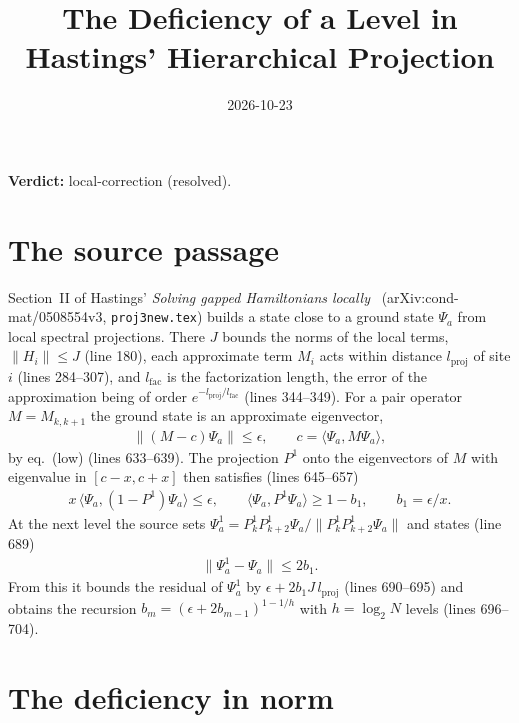 \documentclass{article}
\title{The Deficiency of a Level in Hastings' Hierarchical Projection}
\author{}
\date{2026-10-23}
\providecommand{\gapnote}[2]{\par\noindent\textbf{Verdict:} #1 (#2).\par}
\begin{document}
\maketitle
\gapnote{local-correction}{resolved}

\section{The source passage}

Section~II of Hastings' \emph{Solving gapped Hamiltonians
    locally}~\cite{Hastings2006Solving} (arXiv:cond-mat/0508554v3,
\texttt{proj3new.tex}) builds a state close to a ground state $\Psi_a$ from
local spectral projections. There $J$ bounds the norms of the local terms,
$\lVert H_i\rVert\le J$ (line 180), each approximate term $M_i$ acts within
distance $l_{\mathrm{proj}}$ of site $i$ (lines 284--307), and
$l_{\mathrm{fac}}$ is the factorization length, the error of the
approximation being of order $e^{-l_{\mathrm{proj}}/l_{\mathrm{fac}}}$
(lines 344--349). For a pair operator $M=M_{k,k+1}$ the ground state
is an approximate eigenvector,
\begin{align}\label{eq:hastings05_hierarchical_projection_ground_state_residual}
    \bigl\lVert(M-c)\Psi_a\bigr\rVert\le\epsilon,
    \qquad c=\langle\Psi_a,M\Psi_a\rangle,
\end{align}
by eq.~(low) (lines 633--639). The projection $P^1$ onto the eigenvectors of
$M$ with eigenvalue in $[c-x,c+x]$ then satisfies (lines 645--657)
\begin{align}\label{eq:hastings05_hierarchical_projection_projection_expectation}
    x\,\langle\Psi_a,(1-P^1)\Psi_a\rangle\le\epsilon,
    \qquad\langle\Psi_a,P^1\Psi_a\rangle\ge1-b_1,
    \qquad b_1=\epsilon/x .
\end{align}
At the next level the source sets
$\Psi^1_a=P^1_kP^1_{k+2}\Psi_a/\lVert P^1_kP^1_{k+2}\Psi_a\rVert$ and states
(line 689)
\begin{align}\label{eq:hastings05_hierarchical_projection_normalized_projection_distance}
    \lVert\Psi^1_a-\Psi_a\rVert\le2b_1 .
\end{align}
From this it bounds the residual of $\Psi^1_a$ by $\epsilon+2b_1J\,l_{\mathrm{proj}}$
(lines 690--695) and obtains the recursion
$b_m=(\epsilon+2b_{m-1})^{1-1/h}$ with $h=\log_2N$ levels (lines 696--704).

\section{The deficiency in norm}
\end{document}
